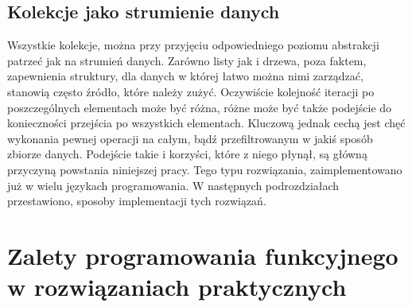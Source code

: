 \documentclass[a4paper,10pt]{report}
\begin{document}
\section{Kolekcje jako strumienie danych}
Wszystkie kolekcje, można przy przyjęciu odpowiedniego poziomu abstrakcji patrzeć jak na strumień danych. Zarówno listy jak i drzewa, poza faktem, zapewnienia struktury, dla danych w której łatwo można nimi zarządzać, stanowią często źródło, które należy zużyć. Oczywiście kolejność iteracji po poszczególnych elementach może być różna, różne może być także podejście do konieczności przejścia po wszystkich elementach. Kluczową jednak cechą jest chęć wykonania pewnej operacji na całym, bądź przefiltrowanym w jakiś sposób zbiorze danych. Podejście takie i korzyści, które z niego płynął, są główną przyczyną powstania niniejszej pracy. Tego typu rozwiązania, zaimplementowano już w wielu językach programowania. W następnych podrozdziałach przestawiono, sposoby implementacji tych rozwiązań.
\chapter{Zalety programowania funkcyjnego w rozwiązaniach praktycznych}
\end{document}
